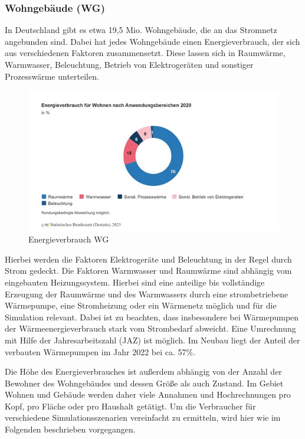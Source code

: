 \subsubsection{Wohngebäude (WG)}

In Deutschland gibt es etwa 19,5 Mio. Wohngebäude, die an das Stromnetz angebunden sind. Dabei hat jedes Wohngebäude einen Energieverbrauch, der sich aus verschiedenen Faktoren zusammensetzt. 
Diese lassen sich in Raumwärme, Warmwasser, Beleuchtung, Betrieb von Elektrogeräten und sonstiger Prozesswärme unterteilen. 

\begin{figure}[h!]
    \centering
    \includegraphics[width=14cm]{Abbildungen/VerbraucherAbb1.jpg}
    \caption{Energieverbrauch WG}\label{fig:Energieverbrauch_WG}
\end{figure}

Hierbei werden die Faktoren Elektrogeräte und Beleuchtung in der Regel durch Strom gedeckt. 
Die Faktoren Warmwasser und Raumwärme sind abhängig vom eingebauten Heizungssystem. 
Hierbei sind eine anteilige bis vollständige Erzeugung der Raumwärme und des Warmwassers durch eine strombetriebene Wärmepumpe, eine Stromheizung oder ein Wärmenetz möglich und für die Simulation relevant. 
Dabei ist zu beachten, dass insbesondere bei Wärmepumpen der Wärmeenergieverbrauch stark vom Strombedarf abweicht. 
Eine Umrechnung mit Hilfe der Jahresarbeitszahl (JAZ) ist möglich. 
Im Neubau liegt der Anteil der verbauten Wärmepumpen im Jahr 2022 bei ca. 57\%.

Die Höhe des Energieverbrauches ist außerdem abhängig von der Anzahl der Bewohner des Wohngebäudes und dessen Größe als auch Zustand. 
Im Gebiet Wohnen und Gebäude werden daher viele Annahmen und Hochrechnungen pro Kopf, pro Fläche oder pro Haushalt getätigt. Um die Verbraucher für verschiedene Simulationsszenarien vereinfacht zu ermitteln, wird hier wie im Folgenden beschrieben vorgegangen. 

